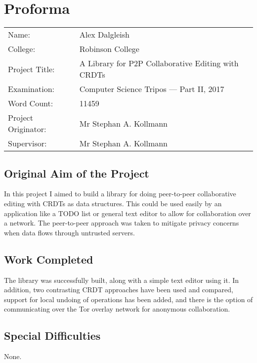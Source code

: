 \documentclass[diss.tex]{subfiles}
\begin{document}
\chapter*{Proforma}
 {\large
  \begin{tabular}{ll}
  Name:               & Alex Dalgleish                   \\
  College:            &  Robinson College                      \\
  Project Title:      &  A Library for P2P Collaborative Editing with CRDTs \\
  Examination:        & Computer Science Tripos --- Part II, 2017  \\
  Word Count:         &  11459  \\
  Project Originator: & Mr Stephan A. Kollmann                    \\
  Supervisor:         & Mr Stephan A. Kollmann                 \\
  \end{tabular}
  }
\section*{Original Aim of the Project}
In this project I aimed to build a library for doing peer-to-peer collaborative editing with CRDTs as data structures. This could be used easily by an application like a TODO list or general text editor to allow for collaboration over a network. The peer-to-peer approach was taken to mitigate privacy concerns when data flows through untrusted servers. 

\section*{Work Completed}
The library was successfully built, along with a simple text editor using it. In addition, two contrasting CRDT approaches have been used and compared, support for local undoing of operations has been added, and there is the option of communicating over the Tor overlay network for anonymous collaboration.

  \section*{Special Difficulties}
  None.
\end{document}
